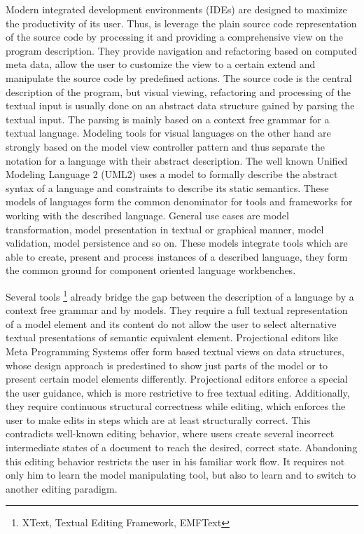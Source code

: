 Modern integrated development environments (IDEs) are designed to maximize the productivity of its user. Thus, is leverage the plain source code representation of the source code by processing it and providing a comprehensive view on the program description. They provide navigation and refactoring based on computed meta data, allow the user to customize the view to a certain extend and manipulate the source code by predefined actions. The source code is the central description of the program, but visual viewing, refactoring and processing of the textual input is usually done on an abstract data structure gained by parsing the textual input. The parsing is mainly based on a context free grammar for a textual language. 
Modeling tools for visual languages on the other hand are strongly based on the model view controller pattern and thus separate the notation for a language with their abstract description. The well known Unified Modeling Language 2 (UML2) uses a model to formally describe the abstract syntax of a language and constraints to describe its static semantics. These models of languages form the common denominator for tools and frameworks for working with the described language. General use cases are model transformation, model presentation in textual or graphical manner, model validation, model persistence and so on. These models integrate tools which are able to create, present and process instances of a described language, they form the common ground for component oriented language workbenches. 

Several tools \footnote{\raggedright XText, Textual Editing Framework, EMFText} already bridge the gap between the description of a language by a context free grammar and by models. They require a full textual representation of a model element and its content do not allow the user to select alternative textual presentations of semantic equivalent element. Projectional editors like Meta Programming Systems offer form based textual views on data structures, whose design approach is 	 predestined to show just parts of the model or to present certain model elements differently. Projectional editors enforce a special the user guidance, which is more restrictive to free textual editing. Additionally, they require continuous structural correctness while editing, which enforces the user to make edits in steps which are at least structurally correct. This contradicts well-known editing behavior, where users create several incorrect intermediate states of a document to reach the desired, correct state. Abandoning this editing behavior restricts the user in his familiar work flow. It requires not only him to learn the model manipulating tool, but also to learn and to switch to another editing paradigm. 

